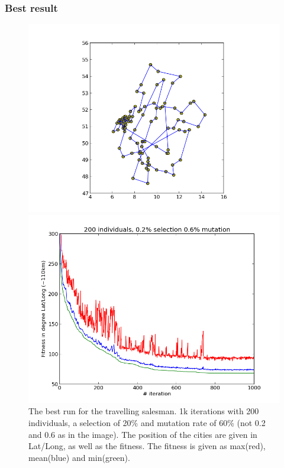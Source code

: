 \documentclass{scrartcl}
\begin{document}
\subsubsection{Best result}

\begin{figure}[H]
\centering
\begin{minipage}{.5\textwidth}
  \centering
  \includegraphics[width=.8\linewidth]{img/ex3/68,46-1-1000-200-0,2-0,6.png}
\end{minipage}%
\begin{minipage}{.5\textwidth}
  \centering
  \includegraphics[width=.8\linewidth]{img/ex3/68,46-1-1000-200-0,2-0,6-fitness.png}
\end{minipage}
\caption{The best run for the travelling salesman. 1k iterations with 200 individuals, a selection of 20\% and mutation rate of 60\% (not 0.2 and 0.6 as in the image). The position of the cities are given in Lat/Long, as well as the fitness. The fitness is given as max(red), mean(blue) and min(green).}
\label{fig:}
\end{figure}
\end{document}
